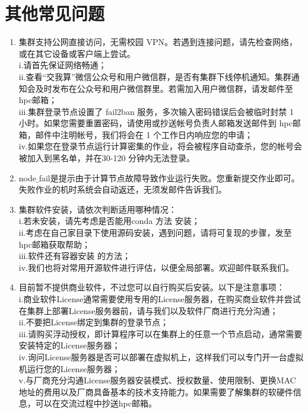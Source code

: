 \documentclass[cn, 12pt, hang, black, chinese]{elegantbook}
\begin{document}
\section{其他常见问题}
\begin{enumerate}[itemsep=1.3ex]
  \item {}
    集群支持公网直接访问，无需校园 VPN。若遇到连接问题，请先检查网络，或在其它设备或客户端上尝试。\\i.请首先保证网络畅通；\\ii.查看“交我算”微信公众号和用户微信群，是否有集群下线停机通知。集群通知会及时发布在公众号和用户微信群里。若需加入用户微信群，请发邮件至 hpc邮箱；\\iii.集群登录节点设置了 fail2ban 服务，多次输入密码错误后会被临时封禁 1 小时。如果您需要重置密码，请使用或抄送帐号负责人邮箱发送邮件到 hpc邮箱，邮件中注明帐号，我们将会在 1 个工作日内响应您的申请；\\iv.如果您在登录节点运行计算密集的作业，将会被程序自动查杀，您的帐号会被加入到黑名单，并在30-120 分钟内无法登录。
  \item {}
    node$\_$fail是提示由于计算节点故障导致作业运行失败。您重新提交作业即可。失败作业的机时系统会自动返还，无须发邮件告诉我们。
  \item {}
    集群软件安装，请依次判断适用哪种情况：\\i.若未安装，请先考虑是否能用conda 方法 安装；\\ii.考虑在自己家目录下使用源码安装，遇到问题，请将可复现的步骤，发至hpc邮箱获取帮助；\\iii.软件还有容器安装 的方法；\\iv.我们也将对常用开源软件进行评估，以便全局部署。欢迎邮件联系我们。
  \item {}
    目前暂不提供商业软件，不过您可以自行购买后安装。以下是注意事项：\\i.商业软件License通常需要使用专用的License服务器，在购买商业软件并尝试在集群上部署License服务器前，请与我们以及软件厂商进行充分沟通；\\ii.不要把License绑定到集群的登录节点；\\iii.请购买浮动授权，即计算程序可以在集群上的任意一个节点启动，通常需要安装特定的License服务器；\\iv.询问License服务器是否可以部署在虚拟机上，这样我们可以专门开一台虚拟机运行您的License服务器；\\v.与厂商充分沟通License服务器安装模式、授权数量、使用限制、更换MAC地址的费用以及厂商具备基本的技术支持能力。如果需要了解集群的软硬件信息，可以在交流过程中抄送hpc邮箱。

\end{enumerate}
\end{document}
